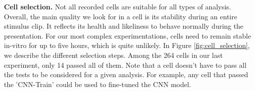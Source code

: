 

\textbf{Cell selection.}
Not all recorded cells are suitable for all types of analysis. Overall, the
main quality we look for in a cell is its stability during an entire stimulus
clip.
It reflects its health and likeliness to behave normally during the
presentation. For our most complex experimentations, cells need to remain
stable in-vitro for up to five hours, which is quite unlikely. In Figure
\ref{fig:cell_selection}, we
describe the different selection steps. Among the 264 cells
in our last experiment, only 14 passed all of them. Note that a cell doesn't have to
pass all the tests to be considered for a given analysis. For example, any cell
that passed the 'CNN-Train' could be used to fine-tuned the CNN model.

